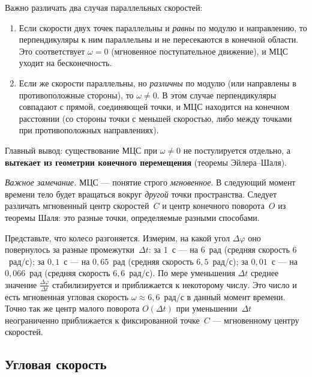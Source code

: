 \documentclass[../main.tex]{subfiles}
\begin{document}
Важно различать два случая параллельных скоростей:
\begin{enumerate}
  \item Если скорости двух точек параллельны и \textit{равны} по модулю и направлению, то перпендикуляры к ним параллельны и не пересекаются в конечной области. Это соответствует $\omega = 0$ (мгновенное поступательное движение), и МЦС уходит на бесконечность.
  \item Если же скорости параллельны, но \textit{различны} по модулю (или направлены в противоположные стороны), то $\omega \ne 0$. В этом случае перпендикуляры совпадают с прямой, соединяющей точки, и МЦС находится на конечном расстоянии (со стороны точки с меньшей скоростью, либо между точками при противоположных направлениях).
\end{enumerate}

Главный вывод: существование МЦС при $\omega \ne 0$
не постулируется отдельно, а \textbf{вытекает из геометрии конечного перемещения}
(теоремы Эйлера--Шаля).

\noindent\textit{Важное замечание.}
МЦС --- понятие строго \textit{мгновенное}.
В следующий момент времени тело будет вращаться вокруг \textit{другой} точки пространства.
Следует различать мгновенный центр скоростей~$C$ и центр конечного поворота~$O$
из теоремы Шаля: это разные точки, определяемые разными способами.

\begin{example}
Представьте, что колесо разгоняется.
Измерим, на какой угол $\Delta\varphi$ оно повернулось за разные промежутки~$\Delta t$:
за $1$~с --- на $6$~рад (средняя скорость $6$~рад/с);
за $0{,}1$~с --- на $0{,}65$~рад (средняя скорость $6{,}5$~рад/с);
за $0{,}01$~с --- на $0{,}066$~рад (средняя скорость $6{,}6$~рад/с).
По мере уменьшения $\Delta t$ среднее значение $\frac{\Delta\varphi}{\Delta t}$
стабилизируется и приближается к некоторому числу. Это число и есть
мгновенная угловая скорость $\omega \approx 6{,}6$~рад/с в данный момент времени.
Точно так же центр малого поворота $O(\Delta t)$ при уменьшении~$\Delta t$
неограниченно приближается к фиксированной точке~$C$ --- мгновенному центру скоростей.
\end{example}

\subsection{Угловая скорость}
\end{document}
